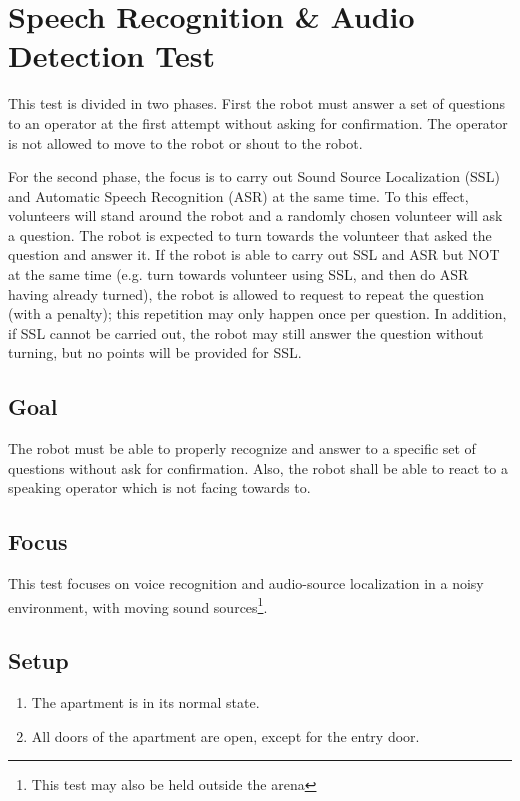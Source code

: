 \section{Speech Recognition \& Audio Detection Test}

This test is divided in two phases. First the robot must answer a set of questions to an operator at the first attempt without asking for confirmation. The operator is not allowed to move to the robot or shout to the robot.

For the second phase, the focus is to carry out Sound Source Localization (SSL) and Automatic Speech Recognition (ASR) at the same time. To this effect, volunteers will stand around the robot and a randomly chosen volunteer will ask a question. The robot is expected to turn towards the volunteer that asked the question and answer it. If the robot is able to carry out SSL and ASR but NOT at the same time (e.g. turn towards volunteer using SSL, and then do ASR having already turned), the robot is allowed to request to repeat the question (with a penalty); this repetition may only happen once per question. In addition, if SSL cannot be carried out, the robot may still answer the question without turning, but no points will be provided for SSL.

\subsection{Goal}
The robot must be able to properly recognize and answer to a specific set of questions without ask for confirmation. Also, the robot shall be able to react to a speaking operator which is not facing towards to.

\subsection{Focus}

This test focuses on voice recognition and audio-source localization in a noisy environment, with moving sound sources\footnote{This test may also be held outside the arena}.

\subsection{Setup}
\begin{enumerate}
\item The apartment is in its normal state.
\item All doors of the apartment are open, except for the entry door. 
\end{enumerate}

